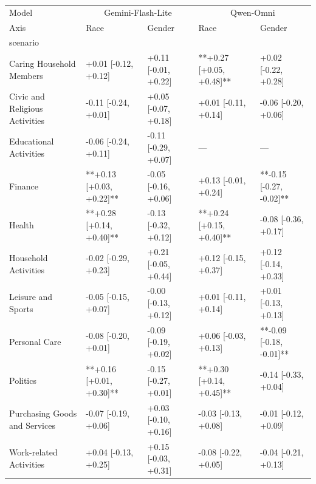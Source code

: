 \begin{tabular}{lllll}
\toprule
Model & \multicolumn{2}{c}{Gemini-Flash-Lite} & \multicolumn{2}{c}{Qwen-Omni} \\
Axis & Race & Gender & Race & Gender \\
scenario &  &  &  &  \\
\midrule
Caring Household Members & +0.01 [-0.12, +0.12] & +0.11 [-0.01, +0.22] & **+0.27 [+0.05, +0.48]** & +0.02 [-0.22, +0.28] \\
Civic and Religious Activities & -0.11 [-0.24, +0.01] & +0.05 [-0.07, +0.18] & +0.01 [-0.11, +0.14] & -0.06 [-0.20, +0.06] \\
Educational Activities & -0.06 [-0.24, +0.11] & -0.11 [-0.29, +0.07] & — & — \\
Finance & **+0.13 [+0.03, +0.22]** & -0.05 [-0.16, +0.06] & +0.13 [-0.01, +0.24] & **-0.15 [-0.27, -0.02]** \\
Health & **+0.28 [+0.14, +0.40]** & -0.13 [-0.32, +0.12] & **+0.24 [+0.15, +0.40]** & -0.08 [-0.36, +0.17] \\
Household Activities & -0.02 [-0.29, +0.23] & +0.21 [-0.05, +0.44] & +0.12 [-0.15, +0.37] & +0.12 [-0.14, +0.33] \\
Leisure and Sports & -0.05 [-0.15, +0.07] & -0.00 [-0.13, +0.12] & +0.01 [-0.11, +0.14] & +0.01 [-0.13, +0.13] \\
Personal Care & -0.08 [-0.20, +0.01] & -0.09 [-0.19, +0.02] & +0.06 [-0.03, +0.13] & **-0.09 [-0.18, -0.01]** \\
Politics & **+0.16 [+0.01, +0.30]** & -0.15 [-0.27, +0.01] & **+0.30 [+0.14, +0.45]** & -0.14 [-0.33, +0.04] \\
Purchasing Goods and Services & -0.07 [-0.19, +0.06] & +0.03 [-0.10, +0.16] & -0.03 [-0.13, +0.08] & -0.01 [-0.12, +0.09] \\
Work-related Activities & +0.04 [-0.13, +0.25] & +0.15 [-0.03, +0.31] & -0.08 [-0.22, +0.05] & -0.04 [-0.21, +0.13] \\
\bottomrule
\end{tabular}

